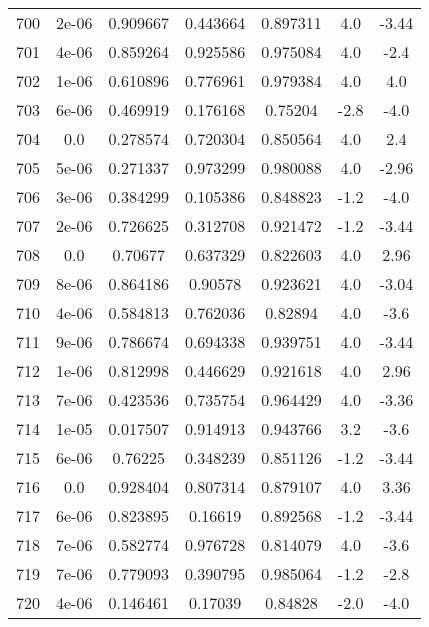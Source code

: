 \begin{table}
\begin{tabular}{c|c|c|c|c|c|c}
700 & 2e-06 & 0.909667 & 0.443664 & 0.897311 & 4.0 & -3.44\\
701 & 4e-06 & 0.859264 & 0.925586 & 0.975084 & 4.0 & -2.4\\
702 & 1e-06 & 0.610896 & 0.776961 & 0.979384 & 4.0 & 4.0\\
703 & 6e-06 & 0.469919 & 0.176168 & 0.75204 & -2.8 & -4.0\\
704 & 0.0 & 0.278574 & 0.720304 & 0.850564 & 4.0 & 2.4\\
705 & 5e-06 & 0.271337 & 0.973299 & 0.980088 & 4.0 & -2.96\\
706 & 3e-06 & 0.384299 & 0.105386 & 0.848823 & -1.2 & -4.0\\
707 & 2e-06 & 0.726625 & 0.312708 & 0.921472 & -1.2 & -3.44\\
708 & 0.0 & 0.70677 & 0.637329 & 0.822603 & 4.0 & 2.96\\
709 & 8e-06 & 0.864186 & 0.90578 & 0.923621 & 4.0 & -3.04\\
710 & 4e-06 & 0.584813 & 0.762036 & 0.82894 & 4.0 & -3.6\\
711 & 9e-06 & 0.786674 & 0.694338 & 0.939751 & 4.0 & -3.44\\
712 & 1e-06 & 0.812998 & 0.446629 & 0.921618 & 4.0 & 2.96\\
713 & 7e-06 & 0.423536 & 0.735754 & 0.964429 & 4.0 & -3.36\\
714 & 1e-05 & 0.017507 & 0.914913 & 0.943766 & 3.2 & -3.6\\
715 & 6e-06 & 0.76225 & 0.348239 & 0.851126 & -1.2 & -3.44\\
716 & 0.0 & 0.928404 & 0.807314 & 0.879107 & 4.0 & 3.36\\
717 & 6e-06 & 0.823895 & 0.16619 & 0.892568 & -1.2 & -3.44\\
718 & 7e-06 & 0.582774 & 0.976728 & 0.814079 & 4.0 & -3.6\\
719 & 7e-06 & 0.779093 & 0.390795 & 0.985064 & -1.2 & -2.8\\
720 & 4e-06 & 0.146461 & 0.17039 & 0.84828 & -2.0 & -4.0\\
\end{tabular}
\end{table}
\newpage

